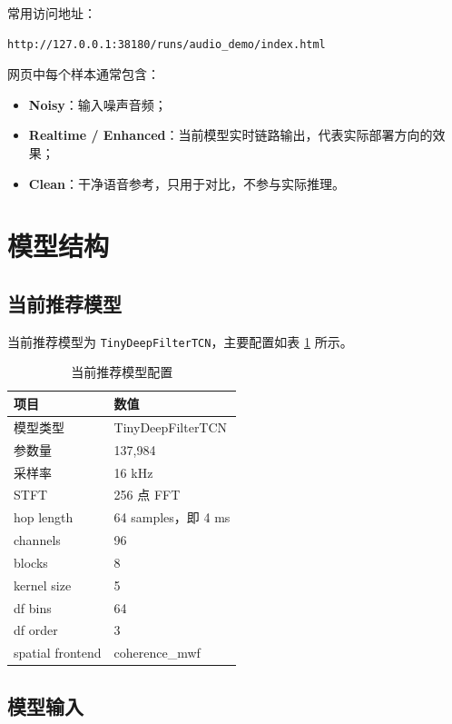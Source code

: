 \documentclass[UTF8,12pt,a4paper]{ctexart}
\begin{document}
常用访问地址：

\begin{lstlisting}
http://127.0.0.1:38180/runs/audio_demo/index.html
\end{lstlisting}

网页中每个样本通常包含：

\begin{itemize}
  \item \textbf{Noisy}：输入噪声音频；
  \item \textbf{Realtime / Enhanced}：当前模型实时链路输出，代表实际部署方向的效果；
  \item \textbf{Clean}：干净语音参考，只用于对比，不参与实际推理。
\end{itemize}

\section{模型结构}

\subsection{当前推荐模型}

当前推荐模型为 \texttt{TinyDeepFilterTCN}，主要配置如表 \ref{tab:model_config} 所示。

\begin{table}[H]
\centering
\caption{当前推荐模型配置}
\label{tab:model_config}
\begin{tabular}{ll}
\toprule
\textbf{项目} & \textbf{数值} \\
\midrule
模型类型 & TinyDeepFilterTCN \\
参数量 & 137,984 \\
采样率 & 16 kHz \\
STFT & 256 点 FFT \\
hop length & 64 samples，即 4 ms \\
channels & 96 \\
blocks & 8 \\
kernel size & 5 \\
df bins & 64 \\
df order & 3 \\
spatial frontend & coherence\_mwf \\
\bottomrule
\end{tabular}
\end{table}

\subsection{模型输入}
\end{document}
